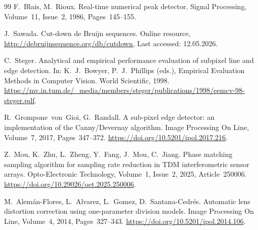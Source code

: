 \documentclass[14pt,a4paper]{extarticle}
\begin{document}
\begin{thebibliography}{99}
F.~Blais, M.~Rioux.
Real-time numerical peak detector.
Signal Processing,
Volume~11, Issue~2,
1986,
Pages~145--155.

J.~Sawada.
Cut-down de Bruijn sequences.
Online resource,
\url{http://debruijnsequence.org/db/cutdown},
Last accessed: 12.05.2026.

C.~Steger.
Analytical and empirical performance evaluation of subpixel line and edge detection.
In: K.~J.~Bowyer, P.~J.~Phillips (eds.),
Empirical Evaluation Methods in Computer Vision.
World Scientific,
1998.
\url{https://mv.in.tum.de/_media/members/steger/publications/1998/eemcv-98-steger.pdf}.

R.~Grompone~von~Gioi, G.~Randall.
A sub-pixel edge detector: an implementation of the Canny/Devernay algorithm.
Image Processing On Line,
Volume~7,
2017,
Pages~347--372.
\url{https://doi.org/10.5201/ipol.2017.216}.


Z.~Mou, K.~Zhu, L.~Zheng, Y.~Fang, J.~Mou, C.~Jiang.
Phase matching sampling algorithm for sampling rate reduction in TDM interferometric sensor arrays.
Opto-Electronic Technology,
Volume~1, Issue~2,
2025,
Article~250006.
\url{https://doi.org/10.29026/oet.2025.250006}.

M.~Alemán\mbox{-}Flores, L.~Alvarez, L.~Gomez, D.~Santana\mbox{-}Cedrés.
Automatic lens distortion correction using one-parameter division models.
Image Processing On Line,
Volume~4,
2014,
Pages~327--343.
\url{https://doi.org/10.5201/ipol.2014.106}.

\end{thebibliography}
\end{document}
